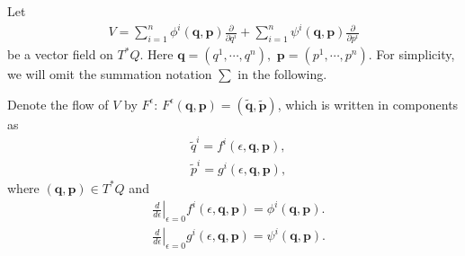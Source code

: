 \documentclass[a4paper,a4paper]{article}
\def\q{\boldsymbol{q}}
\def\p{\boldsymbol{p}}
\begin{document}
Let
\begin{align}
   V=\sum_{i=1}^{n}\phi^{i}(\q, \p)\frac{\partial}{\partial q^{i}}
         +\sum_{i=1}^{n}\psi^{i}(\q, \p)\frac{\partial}{\partial p^{i}} \label{1.2}
\end{align}
be a  vector field on $T^{*}Q$. Here $\q=(q^{1},\cdots, q^{n}),\,\,
\p=(p^{1}, \cdots, p^{n}).$ For simplicity, we will omit the summation notation
$\sum$ in the following.

Denote the flow of $V$ by $F^{\epsilon}$:  $F^{\epsilon}(\q, \p)=
(\tilde{\q}, \tilde{\p})$, which is written in components as
\begin{align}
  &\tilde{q}^{i}=f^{i}(\epsilon, \q, \p),\label{1.3}\\
  &\tilde{p}^{i}=g^{i}(\epsilon, \q, \p),  \label{1.4}
\end{align}
where $(\q, \p)\in T^{*}Q$ and
\begin{align*}
   &\left.\frac{d}{d\epsilon}\right|_{\epsilon=0}f^{i}(\epsilon, \q, \p)
            =\phi^{i}(\q, \p).\\
   &\left.\frac{d}{d\epsilon}\right|_{\epsilon=0}g^{i}(\epsilon, \q, \p)
            =\psi^{i}(\q, \p).
\end{align*}
\end{document}
